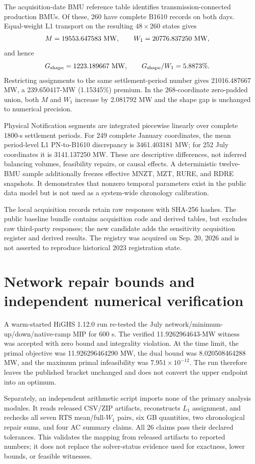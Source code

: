 \documentclass[10pt,journal,onecolumn]{IEEEtran}
\begin{document}
The acquisition-date BMU reference table identifies transmission-connected production BMUs. Of these, 260 have complete B1610 records on both days. Equal-weight L1 transport on the resulting $48\times260$ states gives
\[
M=19553.647583\ {\rm MW},\qquad W_1=20776.837250\ {\rm MW},
\]
and hence
\[
G_{\rm shape}=1223.189667\ {\rm MW},\qquad G_{\rm shape}/W_1=5.8873\%.
\]
Restricting assignments to the same settlement-period number gives 21016.487667 MW, a 239.650417-MW (1.15345\%) premium. In the 268-coordinate zero-padded union, both $M$ and $W_1$ increase by 2.081792 MW and the shape gap is unchanged to numerical precision.

Physical Notification segments are integrated piecewise linearly over complete 1800-s settlement periods. For 249 complete January coordinates, the mean period-level L1 PN-to-B1610 discrepancy is 3461.403181 MW; for 252 July coordinates it is 3141.137250 MW. These are descriptive differences, not inferred balancing volumes, feasibility repairs, or causal effects. A deterministic twelve-BMU sample additionally freezes effective MNZT, MZT, RURE, and RDRE snapshots. It demonstrates that nonzero temporal parameters exist in the public data model but is not used as a system-wide chronology calibration.

The local acquisition records retain raw responses with SHA-256 hashes. The public baseline bundle contains acquisition code and derived tables, but excludes raw third-party responses; the new candidate adds the sensitivity acquisition register and derived results. The registry was acquired on Sep. 20, 2026 and is not asserted to reproduce historical 2023 registration state.

\section{Network repair bounds and independent numerical verification}
A warm-started HiGHS 1.12.0 run re-tested the July network/minimum-up/down/native-ramp MIP for 600 s. The verified 11.9262964643-MW witness was accepted with zero bound and integrality violation. At the time limit, the primal objective was 11.926296464290 MW, the dual bound was 8.020508464288 MW, and the maximum primal infeasibility was $7.951\times10^{-12}$. The run therefore leaves the published bracket unchanged and does not convert the upper endpoint into an optimum.

Separately, an independent arithmetic script imports none of the primary analysis modules. It reads released CSV/ZIP artifacts, reconstructs $L_1$ assignment, and rechecks all seven RTS mean/full-$W_1$ pairs, six GB quantities, two chronological repair sums, and four AC summary claims. All 26 claims pass their declared tolerances. This validates the mapping from released artifacts to reported numbers; it does not replace the solver-status evidence used for exactness, lower bounds, or feasible witnesses.
\end{document}
